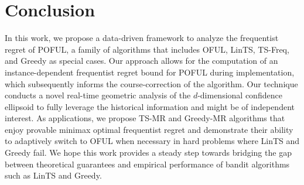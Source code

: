 \section{Conclusion}
\label{sec:conclusion}

In this work, we propose a data-driven framework to analyze the frequentist regret of POFUL, a family of algorithms that includes OFUL, LinTS, TS-Freq, and Greedy as special cases. Our approach allows for the computation of an instance-dependent frequentist regret bound for POFUL during implementation, which subsequently informs the course-correction of the algorithm. Our technique conducts a novel real-time geometric analysis of the $d$-dimensional confidence ellipsoid to fully leverage the historical information and might be of independent interest. As applications, we propose TS-MR and Greedy-MR algorithms that enjoy provable minimax optimal frequentist regret and demonstrate their ability to adaptively switch to OFUL when necessary in hard problems where LinTS and Greedy fail. We hope this work provides a steady step towards bridging the gap between theoretical guarantees and empirical performance of bandit algorithms such as LinTS and Greedy.